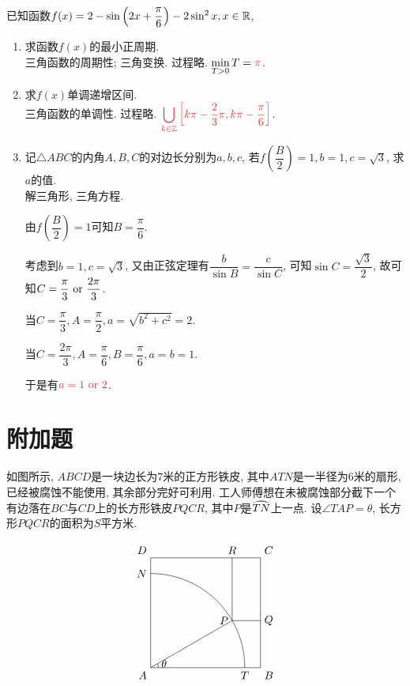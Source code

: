 \documentclass[8pt]{article}
\begin{document}
		已知函数$f(x)=2-\sin \left(2x+\dfrac{\pi}{6}\right)-2\sin^2 x, x\in \mathbb{R}$,

		\begin{enumerate}[label=(\arabic*)]
			\item 求函数$f(x)$的最小正周期.
				~\\

				三角函数的周期性; 三角变换. 过程略. $\displaystyle \min_{T>0}T=\ansmath{\pi}$.

			\item 求$f(x)$单调递增区间.
				~\\

				三角函数的单调性. 过程略. $\displaystyle\ansmath{\bigcup_{k\in\ZZ}\left[k\pi - \frac{2}{3}\pi, k\pi - \frac{\pi}{6}\right]}$.

			\item 记$\triangle ABC$的内角$A, B, C$的对边长分别为$a, b, c$, 若$f\left(\dfrac{B}{2}\right)=1, b=1, c=\sqrt{3}$, 求$a$的值.
				~\\

				解三角形, 三角方程.

				由$f\left(\dfrac{B}{2}\right)=1$可知$B=\dfrac{\pi}{6}$.

				考虑到$b=1, c=\sqrt{3}$, 又由正弦定理有$\dfrac{b}{\sin B}=\dfrac{c}{\sin C}$, 可知$\sin C=\dfrac{\sqrt{3}}{2}$, 故可知$C=\dfrac{\pi}{3} \text{ or } \dfrac{2\pi}{3}$.

				当$C=\dfrac{\pi}{3}, A=\dfrac{\pi}{2}, a=\sqrt{b^2+c^2}=2$.

				当$C=\dfrac{2\pi}{3}, A=\dfrac{\pi}{6}, B=\dfrac{\pi}{6}, a=b=1$.

				于是有$\ansmath{a=1 \lgor 2}$.
		\end{enumerate}

	\section{附加题}
		如图所示, $ABCD$是一块边长为$7$米的正方形铁皮, 其中$ATN$是一半径为$6$米的扇形, 已经被腐蚀不能使用, 其余部分完好可利用. 工人师傅想在未被腐蚀部分截下一个有边落在$BC$与$CD$上的长方形铁皮$PQCR$, 其中$P$是$\arc{TN}$上一点. 设$\angle TAP = \theta$, 长方形$PQCR$的面积为$S$平方米.
		
		$$
		\begin{tikzpicture}[scale=0.5, baseline=0]
    		\draw[black] (0, 0)--(7, 0)--(7, 7)--(0, 7)--(0, 0) node at (0, 0) [anchor=north east] {$A$} node at (7, 0) [anchor=north west] {$B$} node at (7, 7) [anchor=south west] {$C$} node at (0, 7) [anchor=south east] {$D$};
    		\draw[black] (6, 0) arc[start angle=0, end angle=90, radius=6] node at (6, 0) [anchor=north] {$T$} node at (0, 6) [anchor=east] {$N$};
    		\draw[black] (0.5, 0) arc[start angle=0, end angle=30, radius=0.5] node [right] {$\theta$};
    		\draw[black] (0, 0)--({3*sqrt(3)}, 3) node at ({3*sqrt(3)}, 3) [anchor=east]{$P$};
    		\draw[black] ({3*sqrt(3)}, 7)--({3*sqrt(3)}, 3)--(7, 3) node at ({3*sqrt(3)}, 7) [anchor=south] {$R$} node at (7, 3) [anchor=west] {$Q$};
    	\end{tikzpicture}
    	$$
\end{document}
